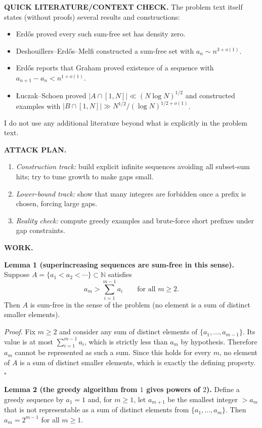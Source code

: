 \medskip
\noindent\textbf{QUICK LITERATURE/CONTEXT CHECK.}
The problem text itself states (without proofs) several results and constructions:
\begin{itemize}
\item Erd\H{o}s proved every such sum-free set has density zero.
\item Deshouillers--Erd\H{o}s--Melfi constructed a sum-free set with $a_n\sim n^{3+o(1)}$.
\item Erd\H{o}s reports that Graham proved existence of a sequence with $a_{n+1}-a_n<n^{1+o(1)}$.
\item \L uczak--Schoen proved $|A\cap[1,N]|\ll (N\log N)^{1/2}$ and constructed examples with $|B\cap[1,N]|\gg N^{1/2}/(\log N)^{1/2+o(1)}$.
\end{itemize}
I do not use any additional literature beyond what is explicitly in the problem text.

\medskip
\noindent\textbf{ATTACK PLAN.}
\begin{enumerate}
\item \emph{Construction track:} build explicit infinite sequences avoiding all subset-sum hits; try to tune growth to make gaps small.
\item \emph{Lower-bound track:} show that many integers are forbidden once a prefix is chosen, forcing large gaps.
\item \emph{Reality check:} compute greedy examples and brute-force short prefixes under gap constraints.
\end{enumerate}

\medskip
\noindent\textbf{WORK.}

\noindent\textbf{Lemma 1 (superincreasing sequences are sum-free in this sense).}
Suppose $A=\{a_1<a_2<\cdots\}\subset\mathbb N$ satisfies
\[
 a_{m} > \sum_{i=1}^{m-1} a_i\qquad\text{for all }m\ge 2.
\]
Then $A$ is sum-free in the sense of the problem (no element is a sum of distinct smaller elements).

\noindent\emph{Proof.}
Fix $m\ge 2$ and consider any sum of distinct elements of $\{a_1,\dots,a_{m-1}\}$. Its value is at most $\sum_{i=1}^{m-1} a_i$, which is strictly less than $a_m$ by hypothesis. Therefore $a_m$ cannot be represented as such a sum.
Since this holds for every $m$, no element of $A$ is a sum of distinct smaller elements, which is exactly the defining property.
\hfill$\square$

\medskip
\noindent\textbf{Lemma 2 (the greedy algorithm from $1$ gives powers of $2$).}
Define a greedy sequence by $a_1=1$ and, for $m\ge 1$, let $a_{m+1}$ be the smallest integer $>a_m$ that is not representable as a sum of distinct elements from $\{a_1,\dots,a_m\}$.
Then $a_m=2^{m-1}$ for all $m\ge 1$.

